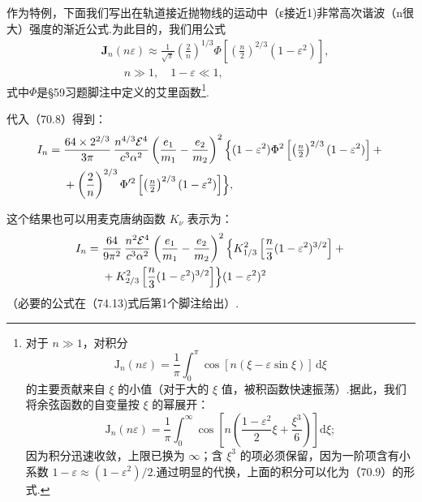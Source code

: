 作为特例，下面我们写出在轨道接近抛物线的运动中（ε接近1)非常高次谐波（n很大）强度的渐近公式.为此目的，我们用公式
\begin{equation}
\begin{aligned}
  &\mathbf{J}_n(n\varepsilon)\approx\frac{1}{\sqrt{\pi}}\left(\frac{2}{n}\right)^{1/3}
  \Phi\left[\left(\frac{n}{2}\right)^{2/3}(1-\varepsilon^2)\right],\\
  &\qquad n\gg1,\quad 1-\varepsilon\ll1,
\end{aligned}
\end{equation}
式中$\Phi$是§59习题脚注中定义的艾里函数\footnote{对于 $n\gg 1$，对积分
\begin{equation*}
  \mathrm{J}_n(n\varepsilon)=\frac{1}{\pi}\int_0^{\pi}\cos[n(\xi-\varepsilon\sin\xi)]\,\mathrm{d}\xi
\end{equation*}
的主要贡献来自 $\xi$ 的小值（对于大的 $\xi$ 值，被积函数快速振荡）.据此，我们将余弦函数的自变量按 $\xi$ 的幂展开：
\begin{equation*}
  \mathrm{J}_n(n\varepsilon)=\frac{1}{\pi}\int_0^{\infty}\cos\left[n\left(\frac{1-\varepsilon^2}{2}\xi+\frac{\xi^3}{6}\right)\right]\mathrm{d}\xi;
\end{equation*}
因为积分迅速收敛，上限已换为 $\infty$；含 $\xi^3$ 的项必须保留，因为一阶项含有小系数 $1-\varepsilon\approx(1-\varepsilon^2)/2$.通过明显的代换，上面的积分可以化为（70.9）的形式.}.

代入（70.8）得到：
\begin{equation}
\begin{aligned}
  I_n={}&\frac{64\times 2^{2/3}}{3\pi}\,\frac{n^{4/3}\mathcal{E}^4}{c^3\alpha^2}
  \left(\frac{e_1}{m_1}-\frac{e_2}{m_2}\right)^2
  \Bigl\{(1-\varepsilon^2)\Phi^2\left[\left(\tfrac{n}{2}\right)^{2/3}(1-\varepsilon^2)\right]+{}\\
  &+\left(\frac{2}{n}\right)^{2/3}\Phi^{\prime 2}\left[\left(\tfrac{n}{2}\right)^{2/3}(1-\varepsilon^2)\right]\Bigr\},
\end{aligned}
\end{equation}

这个结果也可以用麦克唐纳函数 $K_\nu$ 表示为：
\begin{equation*}
\begin{aligned}
  I_n={}&\frac{64}{9\pi^2}\,\frac{n^2\mathcal{E}^4}{c^3\alpha^2}
  \left(\frac{e_1}{m_1}-\frac{e_2}{m_2}\right)^2
  \Bigl\{K_{1/3}^2\left[\frac{n}{3}(1-\varepsilon^2)^{3/2}\right]+{}\\
  &+K_{2/3}^2\left[\frac{n}{3}(1-\varepsilon^2)^{3/2}\right]\Bigr\}(1-\varepsilon^2)^2
\end{aligned}
\end{equation*}
（必要的公式在（74.13)式后第1个脚注给出）.

